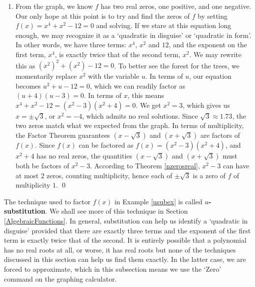 \begin{ex}
\begin{enumerate}
\begin{center}
\begin{tabular}{cc}
\end{tabular}
\end{center} 

\item  From the graph, we know $f$ has two real zeros, one positive, and one negative.  Our only hope at this point is to try and find the zeros of $f$ by setting $f(x)=x^4+x^2-12=0$ and solving.  If we stare at this equation long enough, we may recognize it as a `quadratic in disguise' or `quadratic in form'.   In other words, we have three terms: $x^4$, $x^2$ and $12$, and the exponent on the first term, $x^4$, is exactly twice that of the second term, $x^2$.  We may rewrite this as $\left(x^2\right)^2 + \left(x^2\right) - 12 = 0$.  To better see the forest for the trees, we momentarily replace $x^2$ with the variable $u$.  In terms of $u$, our equation becomes $u^2 + u - 12 = 0$, which we can readily factor as $(u+4)(u-3) = 0$.  In terms of $x$, this means $x^4+x^2-12= \left(x^2-3\right) \left(x^2 + 4 \right)=0$. We get $x^2 = 3$, which gives us $x = \pm \sqrt{3}$, or $x^2=-4$, which admits no real solutions.  Since $\sqrt{3} \approx 1.73$, the two zeros match what we expected from the graph.  In terms of multiplicity, the Factor Theorem guarantees $\left(x - \sqrt{3}\right)$ and $\left(x + \sqrt{3}\right)$ are factors of $f(x)$.  Since $f(x)$ can be factored as $f(x) = \left(x^2-3\right) \left(x^2 + 4 \right)$, and $x^2 + 4$ has no real zeros, the quantities $\left(x - \sqrt{3}\right)$ and $\left(x + \sqrt{3}\right)$ must both be factors of $x^2-3$.  According to Theorem \ref{nzerosreal}, $x^2-3$ can have at most $2$ zeros, counting multiplicity, hence each of $\pm \sqrt{3}$ is a zero of $f$ of multiplicity $1$. \qed

\end{enumerate}

\label{usubex}

\end{ex}

The technique used to factor $f(x)$ in Example \ref{usubex} is called  \textbf{{\boldmath $u$}-substitution}.  We shall see more of this technique in Section \ref{AlgebraicFunctions}.  In general, substitution can help us identify a `quadratic in disguise' provided that there are exactly three terms and the exponent of the first term is exactly twice that of the second.  It is entirely possible that a polynomial has no real roots at all, or worse, it has real roots but none of the techniques discussed in this section can help us find them exactly.  In the latter case, we are forced to approximate, which in this subsection means we use the `Zero' command on the graphing calculator.  


